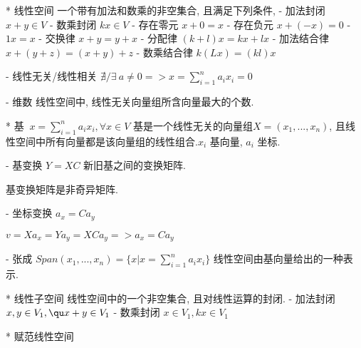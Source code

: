 * 线性空间
	\Define
		一个带有加法和数乘的非空集合, 且满足下列条件,
		- 加法封闭 $x+y \in V$
		- 数乘封闭 $k x \in V$
		- 存在零元 $x+0=x$
		- 存在负元 $x+(-x) = 0$
		- $1x = x$
		- 交换律 $x+y = y+x$
		- 分配律 $(k+l)x = kx+lx$
		- 加法结合律 $x+(y+z) = (x+y) +z$
		- 数乘结合律 $k(Lx) = (kl)x$

	\Property
		- 线性无关/线性相关
			$\nexists / \exists\ a ≠ 0 => x = \sum_{i=1}^n a_i x_i = 0$ 

		- 维数
			线性空间中, 线性无关向量组所含向量最大的个数.

		* 基
			\Define
				$\ x = \sum_{i=1}^n a_i x_i, \forall x \in V$
				基是一个线性无关的向量组$X = (x_1, ... , x_n)$, 且线性空间中所有向量都是该向量组的线性组合.$x_i$ 基向量, $a_i$ 坐标.

			\Property 
				- 基变换
					$Y = X C$
					新旧基之间的变换矩阵.

					\Property
						基变换矩阵是非奇异矩阵.

				- 坐标变换
					$a_x = C a_y$
					
					\Proof
						$v = X a_x = Y a_y = X C a_y => a_x = C a_y$

				- 张成
					$Span(x_1,...,x_n) = \{x | x = \sum_{i=1}^n a_i x_i\}$ 
					线性空间由基向量给出的一种表示.

	* 线性子空间
		\Define
			线性空间中的一个非空集合, 且对线性运算的封闭.
			- 加法封闭 $x,y\in V_1 ,\qu x+y \in V_1$
			- 数乘封闭 $x \in V_1, k x \in V_1$

	\Include
		* 赋范线性空间
		